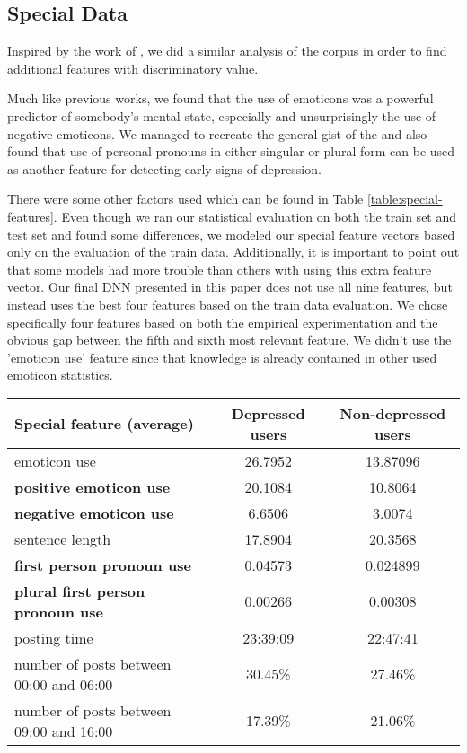 \documentclass[10pt, a4paper]{article}
\begin{document}
\subsection{Special Data}\label{subsec:special}

Inspired by the work of \cite{wang2013depression}, we did a similar analysis of the corpus in order to
 find additional features with discriminatory value.

 Much like previous works, we found that the use of emoticons was a powerful predictor of somebody's
 mental state, especially and unsurprisingly the use of negative emoticons. We managed to recreate
 the general gist of the \cite{wang2013depression} and also found that use of personal pronouns in either
 singular or plural form can be used as another feature for detecting early signs of depression.

 There were some other factors used which can be found in Table \ref{table:special-features}. Even though we ran our
 statistical evaluation on both the train set and test set and found some differences, we modeled
 our special feature vectors based only on the evaluation of the train data. Additionally, it is important
 to point out that some models had more trouble than others with using this extra feature vector. Our
 final DNN presented in this paper does not use all nine features, but instead uses the best four features
 based on the train data evaluation. We chose specifically four features based on both the empirical experimentation
 and the obvious gap between the fifth and sixth most relevant feature. We didn't use the 'emoticon use' feature
 since that knowledge is already contained in other used emoticon statistics.

\begin{table*}[htp]
\caption{Special features statistics on train set (features used in our model are bolded)\label{table:special-features}}
\begin{center}
\begin{tabular}{lcc}
\toprule
Special feature (average) & Depressed users & Non-depressed users\\
\midrule
emoticon use & 26.7952 & 13.87096\\
\textbf{positive emoticon use} & 20.1084 & 10.8064\\
\textbf{negative emoticon use} & 6.6506 & 3.0074\\
sentence length & 17.8904 & 20.3568\\
\textbf{first person pronoun use} & 0.04573 & 0.024899\\
\textbf{plural first person pronoun use} & 0.00266 & 0.00308\\
posting time & 23:39:09 & 22:47:41\\
number of posts between 00:00 and 06:00 & 30.45\% & 27.46\%\\
number of posts between 09:00 and 16:00 & 17.39\% & 21.06\% \\
\bottomrule
\end{tabular}
\end{center}
\end{table*}
\end{document}
